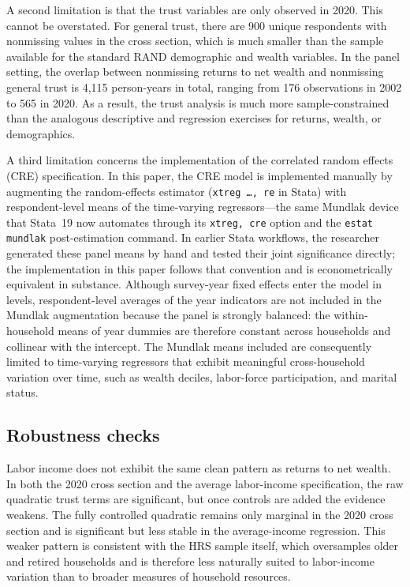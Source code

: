\par A second limitation is that the trust variables are only observed in 2020. This cannot be overstated. For general trust, there are 900 unique respondents with nonmissing values in the cross section, which is much smaller than the sample available for the standard RAND demographic and wealth variables. In the panel setting, the overlap between nonmissing returns to net wealth and nonmissing general trust is 4,115 person-years in total, ranging from 176 observations in 2002 to 565 in 2020. As a result, the trust analysis is much more sample-constrained than the analogous descriptive and regression exercises for returns, wealth, or demographics.

\par A third limitation concerns the implementation of the correlated random effects (CRE) specification. In this paper, the CRE model is implemented manually by augmenting the random-effects estimator (\texttt{xtreg \ldots, re} in Stata) with respondent-level means of the time-varying regressors---the same Mundlak device that Stata~19 now automates through its \texttt{xtreg, cre} option and the \texttt{estat mundlak} post-estimation command. In earlier Stata workflows, the researcher generated these panel means by hand and tested their joint significance directly; the implementation in this paper follows that convention and is econometrically equivalent in substance. Although survey-year fixed effects enter the model in levels, respondent-level averages of the year indicators are not included in the Mundlak augmentation because the panel is strongly balanced: the within-household means of year dummies are therefore constant across households and collinear with the intercept. The Mundlak means included are consequently limited to time-varying regressors that exhibit meaningful cross-household variation over time, such as wealth deciles, labor-force participation, and marital status.

\subsection{Robustness checks}

\par Labor income does not exhibit the same clean pattern as returns to net wealth. In both the 2020 cross section and the average labor-income specification, the raw quadratic trust terms are significant, but once controls are added the evidence weakens. The fully controlled quadratic remains only marginal in the 2020 cross section and is significant but less stable in the average-income regression. This weaker pattern is consistent with the HRS sample itself, which oversamples older and retired households and is therefore less naturally suited to labor-income variation than to broader measures of household resources.

